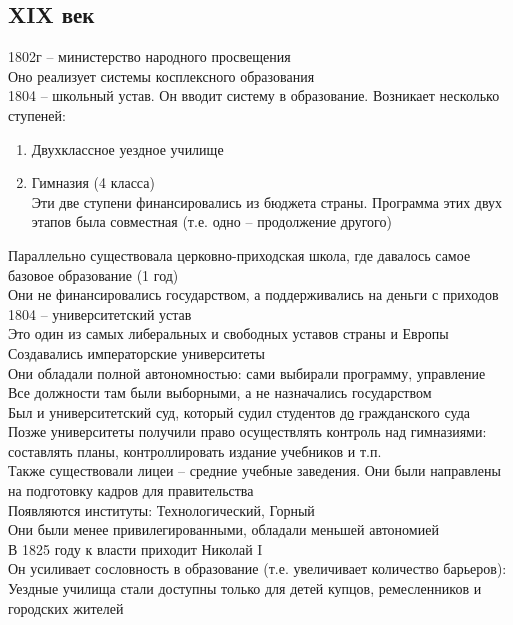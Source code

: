 \documentclass[12pt]{article}
\begin{document}
\subsection*{XIX век}
1802г -- министерство народного просвещения\\
Оно реализует системы косплексного образования\\
1804 -- школьный устав. Он вводит систему в образование. Возникает несколько ступеней:
\begin{enumerate}
    \item Двухклассное уездное училище
    \item Гимназия (4 класса)\\
    Эти две ступени финансировались из бюджета страны. Программа этих двух этапов была совместная (т.е. одно -- продолжение другого)
\end{enumerate}
Параллельно существовала церковно-приходская школа, где давалось самое базовое образование (1 год)\\
Они не финансировались государством, а поддерживались на деньги с приходов\\
1804 -- университетский устав\\
Это один из самых либеральных и свободных уставов страны и Европы\\
Создавались императорские университеты\\
Они обладали полной автономностью: сами выбирали программу, управление\\
Все должности там были выборными, а не назначались государством\\
Был и университетский суд, который судил студентов \underline{до} гражданского суда\\
Позже университеты получили право осуществлять контроль над гимназиями: составлять планы, контроллировать издание учебников и т.п.\\
Также существовали лицеи -- средние учебные заведения. Они были направлены на подготовку кадров для правительства\\
Появляются институты: Технологический, Горный\\
Они были менее привилегированными, обладали меньшей автономией\\
В 1825 году к власти приходит Николай I\\
Он усиливает сословность в образование (т.е. увеличивает количество барьеров):\\
Уездные училища стали доступны только для детей купцов, ремесленников и городских жителей\\
\end{document}
